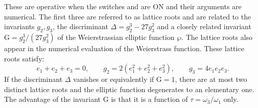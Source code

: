 These are operative when the switches  and  are ON
and their arguments are numerical. The first three are referred to as lattice
roots and are related to the invariants
$g_2, g_3$, the discriminant $\Delta = g_2^3-27g_3^2$ and a closely related
invariant $\mathrm{G} = g_2^3/(27 g_3^2)$ of the Weierstrassian
elliptic function $\wp$. The lattice roots also appear in the numerical
evaluation of the Weierstrass function. These lattice roots satisfy:
\[e_1+e_2+e_3=0,\qquad g_2=2(e_1^2+e_2^2+e_3^2),\qquad g_3= 4e_1e_2e_3.\]
If the discriminant $\Delta$ vanishes or equivalently if $\mathrm{G} = 1$,
there are at most two distinct lattice roots and the elliptic function
degenerates to an elementary one. The advantage of the invariant
$\mathrm{G}$ is that it is a function of $\tau = \omega_3/\omega_1$ only.

